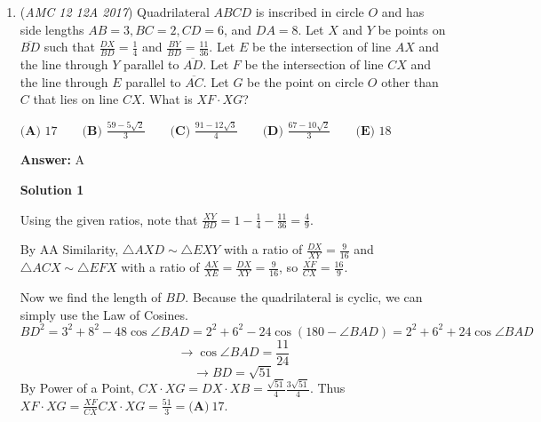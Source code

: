 \begin{enumerate}
 



\textbf{Solution 11}

Simple polynomial division is a feasible method. Even though we have variables, we can equate terms at the end of the division so that we can cancel terms. Doing the division of $\frac{f(x)}{g(x)}$ eventually brings us the final step $(1-a)x^3 + (b-1)x^2 + 90x + c$ minus $(1-a)x^3 - (a-a^2)x^2 + (1-a)x + 10(1-a)$ after we multiply $f(x)$ by $(1-a)$. Now we equate coefficients of same-degree $x$ terms. This gives us $10(1-a) = c, b-1 = a - a^2, 1-a = 90 \Rightarrow a = -89, c = 900, b = -8009$. We are interested in finding $f(1)$, which equals $1^4 + 1^3 -8009\cdot1^2 + 100\cdot1 + 900 = \boxed{\textbf{(C)}\,-7007}$. ~skyscraper

 


 \textbf{Note} Note that $f(1)$ for any polynomial is simply the sum of the coefficients of the polynomial.

 


 


	\item (\textit{AMC 12 12A 2017}) Quadrilateral $ABCD$ is inscribed in circle $O$ and has side lengths $AB=3, BC=2, CD=6$, and $DA=8$. Let $X$ and $Y$ be points on $\overline{BD}$ such that $\frac{DX}{BD} = \frac{1}{4}$ and $\frac{BY}{BD} = \frac{11}{36}$. Let $E$ be the intersection of line $AX$ and the line through $Y$ parallel to $\overline{AD}$. Let $F$ be the intersection of line $CX$ and the line through $E$ parallel to $\overline{AC}$. Let $G$ be the point on circle $O$ other than $C$ that lies on line $CX$. What is $XF\cdot XG$?


 $\textbf{(A) }17\qquad\textbf{(B) }\frac{59 - 5\sqrt{2}}{3}\qquad\textbf{(C) }\frac{91 - 12\sqrt{3}}{4}\qquad\textbf{(D) }\frac{67 - 10\sqrt{2}}{3}\qquad\textbf{(E) }18$

 \textbf{Answer: }A



\textbf{Solution 1}

Using the given ratios, note that $\frac{XY}{BD} = 1 - \frac{1}{4} - \frac{11}{36} = \frac{4}{9}.$

 By AA Similarity, $\triangle AXD \sim \triangle EXY$ with a ratio of $\frac{DX}{XY} = \frac{9}{16}$ and $\triangle ACX \sim \triangle EFX$ with a ratio of $\frac{AX}{XE} = \frac{DX}{XY} = \frac{9}{16}$, so $\frac{XF}{CX} = \frac{16}{9}$.

 Now we find the length of $BD$. Because the quadrilateral is cyclic, we can simply use the Law of Cosines. 
 \[BD^2=3^2+8^2-48\cos\angle BAD=2^2+6^2-24\cos (180-\angle BAD)=2^2+6^2+24\cos\angle BAD\]
 \[\rightarrow \cos\angle BAD = \frac{11}{24}\]
 \[\rightarrow BD=\sqrt{51}\]By Power of a Point, $CX\cdot XG = DX\cdot XB = \frac{\sqrt{51}}{4} \frac{3\sqrt{51}}{4}$. Thus $XF\cdot XG = \frac{XF}{CX} CX\cdot XG = \frac{51}{3} = \boxed{\textbf{(A)}\ 17}.$


\end{enumerate}

